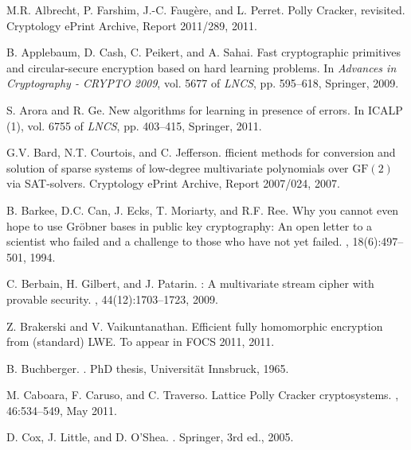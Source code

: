 \documentclass[draft]{llncs}
\begin{document}
\vspace{-3mm}
\begin{thebibliography}{10}

M.R. Albrecht, P. Farshim, J.-C. Faugère, and L. Perret.
\newblock Polly Cracker, revisited.
\newblock Cryptology ePrint Archive, Report 2011/289, 2011.

B. Applebaum, D. Cash, C. Peikert, and A. Sahai.
\newblock Fast cryptographic primitives and circular-secure encryption based on
 hard learning problems.
\newblock In {\em Advances in Cryptography - CRYPTO 2009}, vol. 5677 of {\em
 LNCS}, pp. 595--618, Springer, 2009.

S. Arora and R. Ge.
\newblock New algorithms for learning in presence of errors.
\newblock In {ICALP (1)},
vol. 6755 of {\em LNCS}, pp. 403--415, Springer, 2011.

G.V. Bard, N.T. Courtois, and C. Jefferson.
fficient methods for conversion and solution of sparse
 systems of low-degree multivariate polynomials over $\mathrm{GF}(2)$ via
 {SAT}-solvers.
\newblock Cryptology ePrint Archive, Report 2007/024, 2007.

B. Barkee, D.C. Can, J. Ecks, T. Moriarty, and R.F. Ree.
\newblock Why you cannot even hope to use {G}r{ö}bner bases in public key
 cryptography: An open letter to a scientist who failed and a challenge to
 those who have not yet failed.
, 18(6):497--501, 1994.

C. Berbain, H. Gilbert, and J. Patarin.
: A multivariate stream cipher with provable security.
, 44(12):1703--1723, 2009.

Z. Brakerski and V. Vaikuntanathan.
\newblock Efficient fully homomorphic encryption from (standard) LWE.
\newblock To appear in FOCS 2011, 2011.

B. Buchberger.
.
\newblock PhD thesis, Universität Innsbruck, 1965.

M. Caboara, F. Caruso, and C. Traverso.
\newblock Lattice {P}olly {C}racker cryptosystems.
, 46:534--549, May 2011.

D. Cox, J. Little, and D. O'Shea.
.
\newblock Springer, 3rd ed., 2005.


\end{thebibliography}
\end{document}
